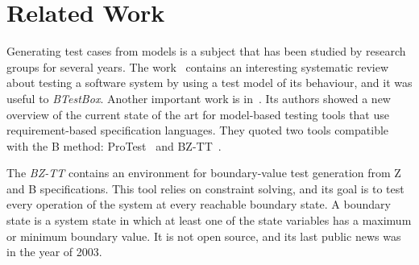\documentclass[runningheads]{llncs}
\begin{document}



\section{Related Work} \label{sec:RelatedWork}
Generating test cases from models is a subject that has been studied by research groups for several years. The work~\cite{shafique2010systematic} contains an interesting systematic review about testing a software system by using a test model of its behaviour, and it was useful to \textit{BTestBox}. Another important work is in~\cite{marinescu:2015}. Its authors showed a new overview of the current state of the art for model-based testing tools that use requirement-based specification languages. They quoted two tools compatible with the B method: ProTest~\cite{leuschel:2005} and BZ-TT~\cite{bouquet:2002}.

The \textit{BZ-TT} contains an environment for boundary-value test generation from Z and B specifications. This tool relies on constraint solving, and its goal is to test every operation of the system at every reachable boundary state. A boundary state is a system state in which at least one of the state variables has a maximum or minimum boundary value. It is not open source, and its last public news was in the year of 2003.
\end{document}

